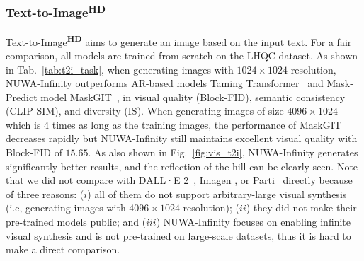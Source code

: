 \documentclass{article}
\begin{document}










\subsubsection{Text-to-Image\textsuperscript{\textbf{HD}}}
Text-to-Image\textsuperscript{\textbf{HD}} aims to generate an image based on the input text. For a fair comparison, all models are trained from scratch on the LHQC dataset. As shown in Tab.~\ref{tab:t2i_task}, when generating images with $1024 \times 1024$ resolution, NUWA-Infinity outperforms AR-based models Taming Transformer~\cite{esserTamingTransformersHighResolution2021} and Mask-Predict model MaskGIT~\cite{changMaskGITMaskedGenerative2022}, in visual quality (Block-FID), semantic consistency (CLIP-SIM), and diversity (IS). When generating images of size  $4096\times 1024$ which is 4 times as long as the training images, the performance of MaskGIT \cite{changMaskGITMaskedGenerative2022} decreases rapidly but NUWA-Infinity still maintains excellent visual quality with Block-FID of $15.65$. As also shown in Fig.~\ref{fig:vis_t2i}, NUWA-Infinity generates significantly better results, and the reflection of the hill can be clearly seen. Note that we did not compare with DALL·E 2~\cite{rameshHierarchicalTextConditionalImage2022}, Imagen \cite{sahariaPhotorealisticTexttoImageDiffusion2022}, or Parti~\cite{yuScalingAutoregressiveModels2022} directly because of three reasons: ($i$) all of them do not support arbitrary-large visual synthesis (i.e, generating images with $4096\times 1024$ resolution);  ($ii$) they did not make their pre-trained models public; and ($iii$) NUWA-Infinity focuses on enabling infinite visual synthesis and is not pre-trained on large-scale datasets, thus it is hard to make a direct comparison.

\end{document}
